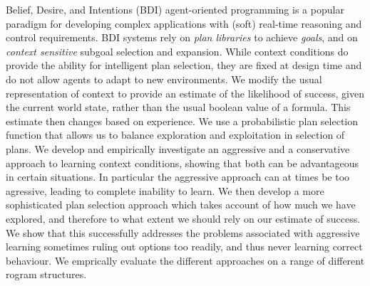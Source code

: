 Belief, Desire, and Intentions (BDI) agent-oriented programming is a popular 
paradigm for developing complex applications with (soft) real-time reasoning
and control requirements. BDI systems rely on \emph{plan libraries} to achieve
\emph{goals}, and on \emph{context sensitive} subgoal selection and
expansion. 
%
While context conditions do provide the ability for intelligent plan
selection, they are fixed at design time and do not allow agents to
adapt to new environments.
% 
We modify the usual representation of context to provide an estimate
of the likelihood of success, given the current world state, rather
than the usual boolean value of a formula. This estimate then changes
based on experience. We use a probabilistic plan selection function
that allows us to balance exploration and exploitation in selection of
plans.
%
We develop and empirically investigate an aggressive and a
conservative approach to learning context conditions, showing that
both can be advantageous in certain situations. In particular the
aggressive approach can at times be too agressive, leading to complete
inability to learn.
%
We then develop a more sophisticated plan selection approach which
takes account of how much we have explored, and therefore to what
extent we should rely on our estimate of success. We show that this
successfully addresses the problems associated with aggressive
learning sometimes ruling out options too readily, and thus never
learning correct behaviour.
% 
We emprically evaluate the different approaches on a range of
different rogram structures.

